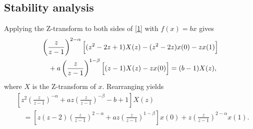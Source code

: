 \documentclass[11pt,a4paper]{article}
\theoremstyle{definition}
\begin{document}
 \subsection{Stability analysis}
 Applying the Z-transform to both sides of \eqref{1} with $f(x) = bx$ gives
 \begin{align*}
 &\left(\frac{z}{z - 1}\right)^{2-\alpha}
 \Bigl[(z^2 - 2z + 1)X(z) - (z^2 - 2z)x(0) - zx(1)\Bigr] \\
 &\quad + a\left(\frac{z}{z - 1}\right)^{1-\beta}
 \Bigl[(z - 1)X(z) - zx(0)\Bigr] = (b - 1)X(z),
 \end{align*}
 where $X$ is the Z-transform of $x$. Rearranging yields
 \begin{align}
 &\left[z^2\left(\frac{z}{z - 1}\right)^{-\alpha}
 + az\left(\frac{z}{z - 1}\right)^{-\beta} - b + 1\right]X(z) \nonumber\\
 &\quad = \left[z(z - 2)\left(\frac{z}{z - 1}\right)^{2-\alpha}
 + az\left(\frac{z}{z - 1}\right)^{1-\beta}\right]x(0)
 + z\left(\frac{z}{z - 1}\right)^{2-\alpha}x(1). \label{ztran}
 \end{align}
 
\end{document}
